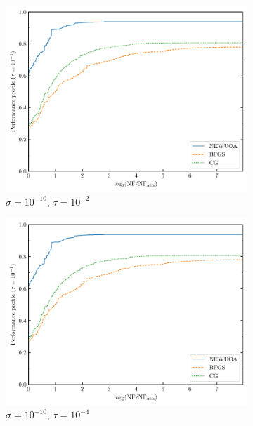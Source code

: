 \documentclass[
    smallextended,  %
    final,          %
]{svjour3}
\begin{document}
\begin{figure}[htbp]
\begin{subfigure}{.45\textwidth}
        \centering
        \includegraphics[width=\textwidth,page=2]{perf-noisy-bfgs_cg_pdfo-50-10.pdf}
        \caption{$\sigma = 10^{-10}$, $\tau = 10^{-2}$}
    \end{subfigure}
    \hfill
    \begin{subfigure}{.45\textwidth}
        \centering
        \includegraphics[width=\textwidth,page=4]{perf-noisy-bfgs_cg_pdfo-50-10.pdf}
        \caption{$\sigma = 10^{-10}$, $\tau = 10^{-4}$}
    \end{subfigure}
    \hfill
    \begin{subfigure}{.45\textwidth}
        \centering

\end{subfigure}
\end{figure}
\end{document}
